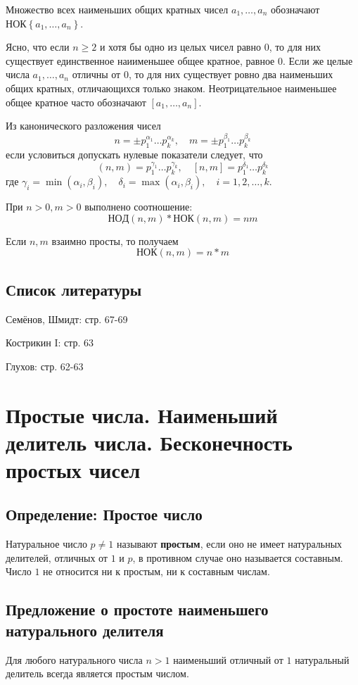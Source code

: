 \documentclass{article}
\newcommand{\cgcd}{\mathrm{НОД}}
\newcommand{\clcm}{\mathrm{НОК}}
\begin{document}
Множество всех наименьших общих кратных чисел $a_1, \dots, a_n$ обозначают $\clcm\left\{a_1, \dots, a_n\right\}$.

Ясно, что если $n \geq 2$ и хотя бы одно из целых чисел равно $0$, то для них существует единственное наиименьшее общее кратное, равное $0$. Если же целые числа $a_1, \dots, a_n$ отличны от $0$, то для них существует ровно два наименьших общих кратных, отличающихся только знаком. Неотрицательное наименьшее общее кратное часто обозначают $\left[a_1, \dots, a_n\right]$.

Из канонического разложения чисел
\[n = \pm p_1^{\alpha_1} \dots p_k^{\alpha_k}, \quad m = \pm p_1^{\beta_1} \dots p_k^{\beta_k}\]
если условиться допускать нулевые показатели следует, что
\[(n, m) = p_1^{\gamma_1} \dots p_k^{\gamma_k}, \quad \left[n, m\right] = p_1^{\delta_1} \dots p_k^{\delta_k}\]
где $\gamma_i = \min(\alpha_i, \beta_i), \quad \delta_i = \max(\alpha_i, \beta_i), \quad i = 1, 2, \dots, k$.

При $n > 0, m > 0$ выполнено соотношение:
\[\cgcd(n, m) * \clcm(n, m) = nm\]

Если $n, m$ взаимно просты, то получаем
\[\clcm(n, m) = n * m\]

\subsection*{Список литературы}
Семёнов, Шмидт: стр. 67-69

Кострикин I: стр. 63

Глухов: стр. 62-63


\newpage
\section{Простые числа. Наименьший делитель числа. Бесконечность простых чисел}
\subsection{Определение: Простое число}
Натуральное число $p \neq 1$ называют \textbf{простым}, если оно не имеет натуральных делителей, отличных от $1$ и $p$, в противном случае оно называется составным. Число $1$ не относится ни к простым, ни к составным числам.

\subsection{Предложение о простоте наименьшего натурального делителя}
Для любого натурального числа $n > 1$ наименьший отличный от $1$ натуральный делитель всегда является простым числом.
\end{document}
